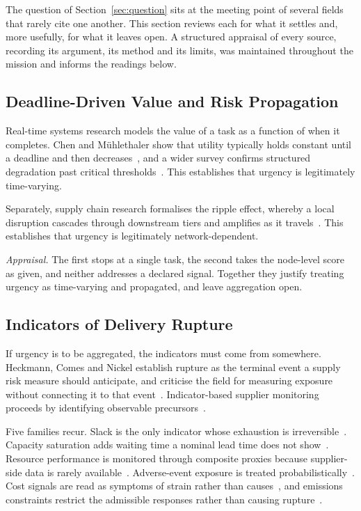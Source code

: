 The question of Section~\ref{sec:question} sits at the meeting point of several fields that
rarely cite one another. This section reviews each for what it settles and, more usefully,
for what it leaves open. A structured appraisal of every source, recording its argument, its
method and its limits, was maintained throughout the mission and informs the readings below.

\subsection{Deadline-Driven Value and Risk Propagation}

Real-time systems research models the value of a task as a function of when it completes.
Chen and M\"uhlethaler show that utility typically holds constant until a deadline and then
decreases~\autocite{cheng1996due}, and a wider survey confirms structured degradation past
critical thresholds~\autocite{cheng2025survey}. This establishes that urgency is legitimately
time-varying.

Separately, supply chain research formalises the ripple effect, whereby a local disruption
cascades through downstream tiers and amplifies as it
travels~\autocite{ivanov2020digital,ivanov2019viable,li2020exploring}. This establishes that
urgency is legitimately network-dependent.

\emph{Appraisal.} The first stops at a single task, the second takes the node-level score as
given, and neither addresses a declared signal. Together they justify treating urgency as
time-varying and propagated, and leave aggregation open.

\subsection{Indicators of Delivery Rupture}

If urgency is to be aggregated, the indicators must come from somewhere. Heckmann, Comes and
Nickel establish rupture as the terminal event a supply risk measure should anticipate, and
criticise the field for measuring exposure without connecting it to that
event~\autocite{heckmann2015critical}. Indicator-based supplier monitoring proceeds by
identifying observable precursors~\autocite{mokhtar2019supplier}.

Five families recur. Slack is the only indicator whose exhaustion is
irreversible~\autocite{cohen2021assigning,sun2020combating}. Capacity saturation adds waiting
time a nominal lead time does not
show~\autocite{tomlin2006value,hosseini2019resilient}. Resource performance is monitored
through composite proxies because supplier-side data is rarely
available~\autocite{mokhtar2019supplier,hlioui2017joint}. Adverse-event exposure is treated
probabilistically~\autocite{hosseini2020ripple,liu2021robust}. Cost signals are read as
symptoms of strain rather than causes~\autocite{shen2019managing}, and emissions constraints
restrict the admissible responses rather than causing
rupture~\autocite{hoen2014effect,smartfreight2023glec}.

